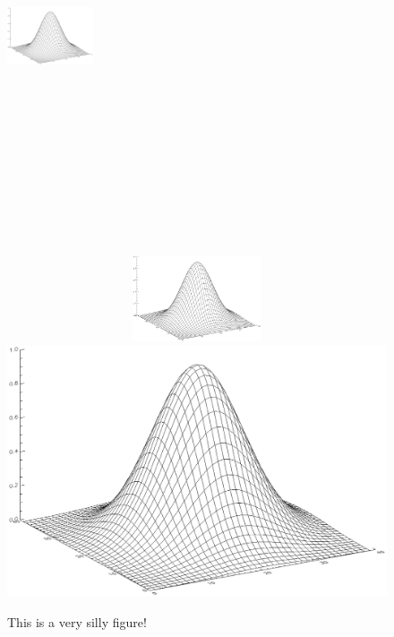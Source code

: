 \documentclass[preprint]{aastex}
\begin{document}
\begin{figure} [!p]
\begin{center}
\includegraphics[width=1in,height=5in]{2dgaussian.ps}
\includegraphics[width=5in,height=1in,angle=180]{2dgaussian.ps}
\includegraphics[scale=0.1,angle=45]{2dgaussian.ps}
\end{center}
\caption{This is a very silly figure! \label{silly}}
\end{figure}
\end{document}
